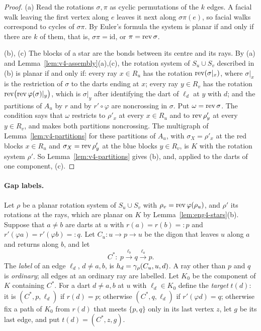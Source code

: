 \begin{proof}
(a) Read the rotations $\sigma,\pi$ as cyclic permutations of the $k$
edges. A facial walk leaving the first vertex along $e$ leaves it next along
$\sigma\pi(e)$, so facial walks correspond to cycles of $\sigma\pi$. By
Euler's formula the system is planar if and only if there are $k$ of them,
that is, $\sigma\pi=\mathrm{id}$, or $\pi=\operatorname{rev}\sigma$.

(b), (c) The blocks of a star are the bonds between its centre and its rays.
By (a) and Lemma~\ref{lem:v4-assembly}(a),(c), the rotation system of
$S_u\cup S_v$ described in (b) is planar if and only if: every ray $x\in
R_u$ has the rotation $\operatorname{rev}(\sigma|_x)$, where $\sigma|_x$ is the
restriction of $\sigma$ to the darts ending at $x$; every ray $y\in R_v$ has
the rotation $\operatorname{rev}\bigl(\operatorname{rev}\varphi(\sigma)|_y\bigr)$, which is $\sigma|_y$
after identifying the dart of $\ell_d$ at $y$ with $d$; and the partitions
of $A_u$ by $r$ and by $r'\circ\varphi$ are noncrossing in $\sigma$. Put
$\omega=\operatorname{rev}\sigma$. The condition says that $\omega$ restricts to
$\rho'_x$ at every $x\in R_u$ and to $\operatorname{rev}\rho'_y$ at every $y\in R_v$, and
makes both partitions noncrossing. The multigraph of
Lemma~\ref{lem:v4-partitions} for these partitions of $A_u$, with
$\sigma_X=\rho'_x$ at the red blocks $x\in R_u$ and $\sigma_X=\operatorname{rev}\rho'_y$
at the blue blocks $y\in R_v$, is $K$ with the rotation system $\rho'$. So
Lemma~\ref{lem:v4-partitions} gives (b), and, applied to the darts of one
component, (c).
\end{proof}

\paragraph{Gap labels.}
Let $\rho$ be a planar rotation system of $S_u\cup S_v$ with
$\rho_v=\operatorname{rev}\varphi(\rho_u)$, and $\rho'$ its rotations at the rays, which
are planar on $K$ by Lemma~\ref{lem:eng4-stars}(b). Suppose that $a\ne b$
are darts at $u$ with $r(a)=r(b)=:p$ and $r'(\varphi a)=r'(\varphi b)=:q$.
Let $C_u:u\to p\to u$ be the digon that leaves $u$ along $a$ and returns
along $b$, and let
\[
C^\ast:\ p\xrightarrow{\ \ell_b\ }q\xrightarrow{\ \ell_a\ }p .
\]
The \emph{label} of an edge $\ell_d$, $d\ne a,b$, is
$h_d=\gamma_\rho(C_u,u,d)$. A ray other than $p$ and $q$ is \emph{ordinary};
all edges at an ordinary ray are labelled. Let $K_0$ be the component of $K$
containing $C^\ast$. For a dart $d\ne a,b$ at $u$ with $\ell_d\in K_0$ define
the \emph{target} $t(d)$: it is $(C^\ast,p,\ell_d)$ if $r(d)=p$; otherwise
$(C^\ast,q,\ell_d)$ if $r'(\varphi d)=q$; otherwise fix a path of $K_0$ from
$r(d)$ that meets $\{p,q\}$ only in its last vertex $z$, let $g$ be its last
edge, and put $t(d)=(C^\ast,z,g)$.

